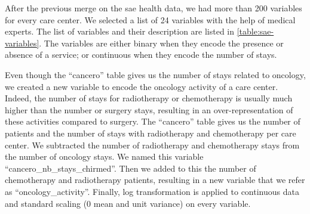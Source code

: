 After the previous merge on the \ac{sae} health data, we had more than 200
variables for every care center. We selected a list of 24 variables with the
help of medical experts. The list of variables and their description are listed in
\cref{table:sae-variables}. The variables are either binary when they encode the
presence or absence of a service; or continuous when they encode the number of
stays. %

Even though the ``cancero'' table gives us the number of stays related to
oncology, we created a new variable to encode the oncology activity of a care
center. Indeed, the number of stays for radiotherapy or chemotherapy is usually
much higher than the number or surgery stays, resulting in an
over-representation of these activities compared to surgery. The ``cancero''
table gives us the number of patients and the number of stays with radiotherapy
and chemotherapy per care center. We subtracted the number of radiotherapy and
chemotherapy stays from the number of oncology stays. We named this variable
``cancero\_nb\_stays\_chirmed''. Then we added to this the number of
chemotherapy and radiotherapy patients, resulting in a new variable that we
refer as ``oncology\_activity''. Finally, log transformation is applied to
continuous data and standard scaling (0 mean and unit variance) on every
variable.

